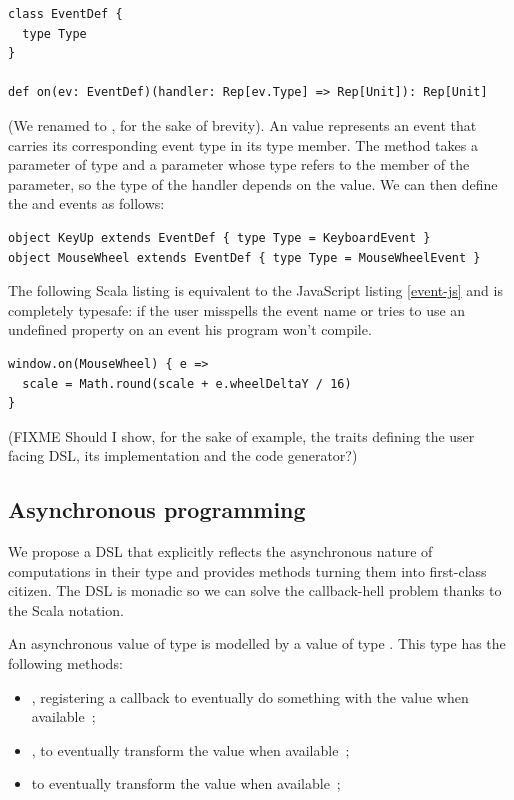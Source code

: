 \documentclass[american,english,runningheads]{llncs}
\begin{document}
\begin{lstlisting}
class EventDef {
  type Type
}

def on(ev: EventDef)(handler: Rep[ev.Type] => Rep[Unit]): Rep[Unit]
\end{lstlisting}

(We renamed  to , for the sake of brevity). An  value represents an event that carries its corresponding event type in its  type member. The  method takes a parameter  of type  and a  parameter whose type refers to the  member of the  parameter, so the type of the handler depends on the  value. We can then define the  and  events as follows:

\begin{lstlisting}
object KeyUp extends EventDef { type Type = KeyboardEvent }
object MouseWheel extends EventDef { type Type = MouseWheelEvent }
\end{lstlisting}

The following Scala listing is equivalent to the JavaScript listing \ref{event-js} and is completely typesafe: if the user misspells the event name or tries to use an undefined property on an event his program won’t compile.

\begin{lstlisting}
window.on(MouseWheel) { e =>
  scale = Math.round(scale + e.wheelDeltaY / 16)
}
\end{lstlisting}

(FIXME Should I show, for the sake of example, the traits defining the user facing DSL, its implementation and the code generator?)

\subsection{Asynchronous programming}

We propose a DSL that explicitly reflects the asynchronous nature of computations in their type and provides methods turning them into first-class citizen. The DSL is monadic so we can solve the callback-hell problem thanks to the Scala  notation.

An asynchronous value of type  is modelled by a value of type . This type has the following methods:
\begin{itemize}
\item {}, registering a callback to eventually do something with the value when available~;
\item {}, to eventually transform the value when available~;
\item {} to eventually transform the value when available~;
\end{itemize}
\end{document}
